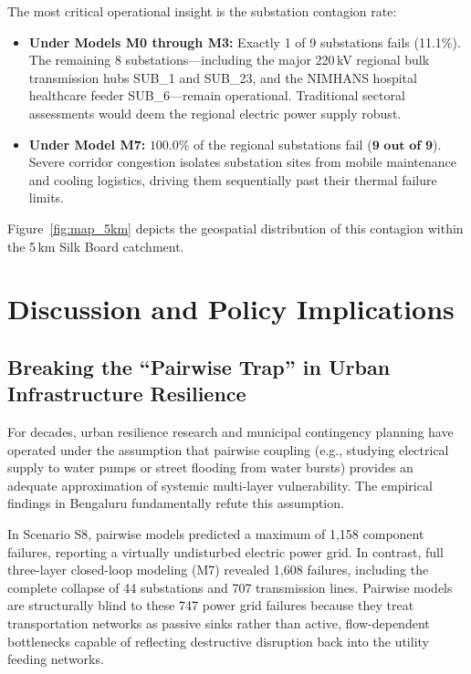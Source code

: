 \documentclass[oneside]{ieeeaccess}
\begin{document}
The most critical operational insight is the substation contagion rate:
\begin{itemize}
    \item \textbf{Under Models M0 through M3:} Exactly 1 of 9 substations fails (11.1\%). The remaining 8 substations---including the major 220\,kV regional bulk transmission hubs SUB\_1 and SUB\_23, and the NIMHANS hospital healthcare feeder SUB\_6---remain operational. Traditional sectoral assessments would deem the regional electric power supply robust.
    \item \textbf{Under Model M7:} $\mathbf{100.0\%}$ of the regional substations fail ($\mathbf{9\text{ out of }9}$). Severe corridor congestion isolates substation sites from mobile maintenance and cooling logistics, driving them sequentially past their thermal failure limits.
\end{itemize}

Figure~\ref{fig:map_5km} depicts the geospatial distribution of this contagion within the 5\,km Silk Board catchment.

\section{Discussion and Policy Implications}
\label{sec:discussion}

\subsection{Breaking the ``Pairwise Trap'' in Urban Infrastructure Resilience}

For decades, urban resilience research and municipal contingency planning have operated under the assumption that pairwise coupling (e.g., studying electrical supply to water pumps or street flooding from water bursts) provides an adequate approximation of systemic multi-layer vulnerability. The empirical findings in Bengaluru fundamentally refute this assumption.

In Scenario S8, pairwise models predicted a maximum of 1,158 component failures, reporting a virtually undisturbed electric power grid. In contrast, full three-layer closed-loop modeling (M7) revealed 1,608 failures, including the complete collapse of 44 substations and 707 transmission lines. Pairwise models are structurally blind to these 747 power grid failures because they treat transportation networks as passive sinks rather than active, flow-dependent bottlenecks capable of reflecting destructive disruption back into the utility feeding networks.
\end{document}

